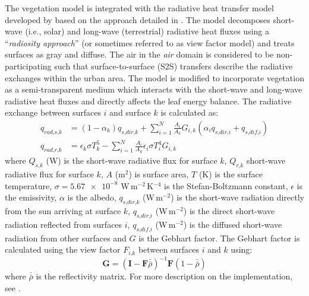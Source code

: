 The vegetation model is integrated with the radiative heat transfer model developed by \cite{Kubilay2018} based on the approach detailed in \cite{Saneinejad2013}. The model decomposes short-wave (i.e., solar) and long-wave (terrestrial) radiative heat fluxes using a ``\textit{radiosity approach}'' (or sometimes referred to as view factor model) and treats surfaces as gray and diffuse. The air in the \textit{air} domain is considered to be non-participating such that surface-to-surface (S2S) transfers describe the radiative exchanges within the urban area. The model is modified to incorporate vegetation as a semi-transparent medium which interacts with the short-wave and long-wave radiative heat fluxes and directly affects the leaf energy balance. The radiative exchange between surfaces $i$ and surface $k$ is calculated as:
\begin{align}
q_{\textit{rad,s,k}} &= \left(1 - \alpha_k\right) q_{\textit{s,dir,k}} + \sum_{i=1}^{N} \frac{A_i}{A_k} G_{i,k} \left( \alpha_i q_{\textit{s,dir,i}} + q_{\textit{s,dif,i}} \right)\\
q_{\textit{rad,r,k}} &= \epsilon_k \sigma T_k^5 - \sum_{i=1}^{N}  \frac{A_i}{A_k} \epsilon_i \sigma T_i^4 G_{i,k}
\label{eq:qradsurf}
\end{align}
where $Q_{\textit{s,k}}$ (W) is the short-wave radiative flux for surface $k$, $Q_{\textit{r,k}}$ short-wave radiative flux for surface $k$, $A$ (m$^2$) is surface area, $T$ (K) is the surface temperature, $\sigma = \num{5.67e-8}$ W\,m$^{-2}$\,K$^{-4}$ is the Stefan-Boltzmann constant, $\epsilon$ is the emissivity, $\alpha$ is the albedo, $q_{\textit{s,dir,k}}$ (W\,m$^{-2}$) is the short-wave radiation directly from the sun arriving at surface $k$, $q_{\textit{s,dir,i}}$ (W\,m$^{-2}$) is the direct short-wave radiation reflected from surfaces $i$, $q_{\textit{s,dif,i}}$ (W\,m$^{-2}$) is the diffused short-wave radiation from other surfaces and $G$ is the Gebhart factor. The Gebhart factor is calculated using the view factor $F_{\textit{i,k}}$ between surfaces $i$ and $k$ using:
\begin{equation}
\mathbf{G} = \left(\mathbf{I} - \mathbf{F}\bar{\bar{\rho}}\right)^{-1} \mathbf{F}\left(1-\bar{\bar{\rho}}\right)
\end{equation}
where $\bar{\bar{\rho}}$ is the reflectivity matrix. For more description on the implementation, see \citep{Saneinejad2013}.



